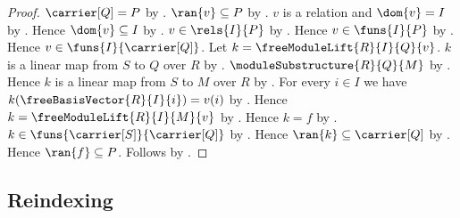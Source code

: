\begin{proof}
    $\carrier[Q]=P$ by .
    $\ran{v}\subseteq P$ by
        .
    $v$ is a relation and $\dom{v}=I$ by
        .
    Hence $\dom{v}\subseteq I$ by .
    $v\in\rels{I}{P}$ by
        .
    Hence $v\in\funs{I}{P}$ by .
    Hence $v\in\funs{I}{\carrier[Q]}$.
    Let $k=\freeModuleLift{R}{I}{Q}{v}$.
    $k$ is a linear map from $S$ to $Q$ over $R$ by
        .
    $\moduleSubstructure{R}{Q}{M}$ by
        .
    Hence $k$ is a linear map from $S$ to $M$ over $R$ by
        .
    For every $i\in I$ we have
        $k(\freeBasisVector{R}{I}{i})=v(i)$ by
        .
    Hence $k=\freeModuleLift{R}{I}{M}{v}$ by
        .
    Hence $k=f$ by .
    $k\in\funs{\carrier[S]}{\carrier[Q]}$ by
        .
    Hence $\ran{k}\subseteq\carrier[Q]$ by .
    Hence $\ran{f}\subseteq P$.
    Follows by .
\end{proof}

\subsection{Reindexing}

